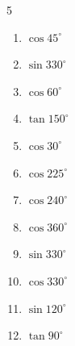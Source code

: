 \begin{multicols}{5}
\begin{enumerate}

  \item $\displaystyle \cos{45^\circ}$


  \item $\displaystyle \sin{330^\circ}$


  \item $\displaystyle \cos{60^\circ}$


  \item $\displaystyle \tan{150^\circ}$


\columnbreak %

  \item $\displaystyle \cos{30^\circ}$


  \item $\displaystyle \cos{225^\circ}$


  \item $\displaystyle \cos{240^\circ}$


  \item $\displaystyle \cos{360^\circ}$

        \phantom{$\displaystyle =1$}

  \item $\displaystyle \sin{330^\circ}$


  \item $\displaystyle \cos{330^\circ}$


  \item $\displaystyle \sin{120^\circ}$


  \item $\displaystyle \tan{90^\circ}$


\end{enumerate}
\end{multicols}
